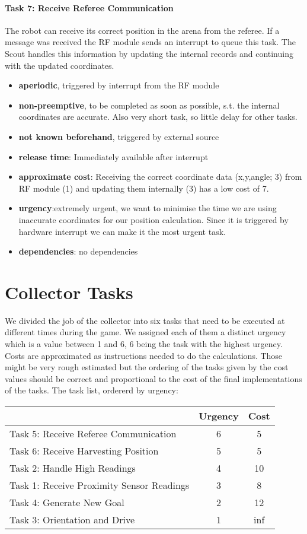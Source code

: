 \documentclass[12pt]{article}
\begin{document}
\paragraph{Task 7: Receive Referee Communication}
The robot can receive its correct position in the arena from the referee. If a message was received the RF module sends an interrupt to queue this task. The Scout handles this information by updating the internal records and continuing with the updated coordinates.
\begin{itemize}
	\item \textbf{aperiodic}, triggered by interrupt from the RF module
	\item \textbf{non-preemptive}, to be completed as soon as possible, s.t. the internal coordinates are accurate. Also very short task, so little delay for other tasks.
	\item \textbf{not known beforehand}, triggered by external source
	\item \textbf{release time}: Immediately available after interrupt
	\item \textbf{approximate cost}: Receiving the correct coordinate data (x,y,angle; 3) from RF module (1) and updating them internally (3) has a low cost of 7.
	\item \textbf{urgency}:extremely urgent, we want to minimise the time we are using inaccurate coordinates for our position calculation. Since it is triggered by hardware interrupt we can make it the most urgent task.
	\item \textbf{dependencies}: no dependencies
\end{itemize}

\newpage
\section*{Collector Tasks}
We divided the job of the collector into six tasks that need to be executed at different times during the game. We assigned each of them a distinct urgency which is a value between 1 and 6, 6 being the task with the highest urgency. Costs are approximated as instructions needed to do the calculations. Those might be very rough estimated but the ordering of the tasks given by the cost values should be correct and proportional to the cost of the final implementations of the tasks.
The task list, ordererd by urgency:\\
\begin{center}
\begin{tabular}{| l | | c | c |}
  \hline
	& Urgency & Cost \\
  \hline
  Task 5: Receive Referee Communication & 6 & 5 \\
  Task 6: Receive Harvesting Position & 5 & 5 \\
  Task 2: Handle High Readings & 4 & 10 \\
  Task 1: Receive Proximity Sensor Readings & 3 & 8 \\
  Task 4: Generate New Goal &  2 & 12\\
  Task 3: Orientation and Drive &  1 & inf \\
  \hline
\end{tabular}
\end{center}
\end{document}
